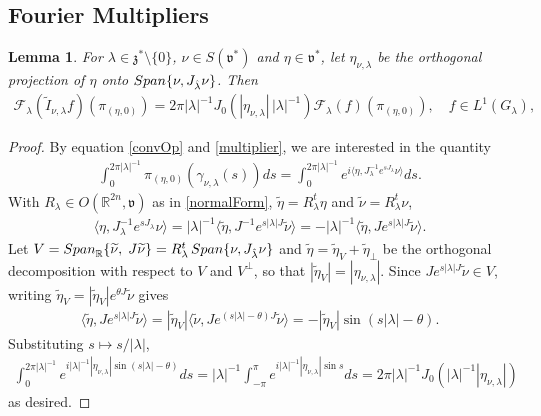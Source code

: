\documentclass[11pt]{amsart}
\theoremstyle{plain}
\newtheorem{lemma}[theorem]{Lemma}
\theoremstyle{definition}
\theoremstyle{remark}
\numberwithin{equation}{section}
\def\fz{\mathfrak{z}}
\def\fv{\mathfrak{v}}
\def\mz{\setminus\{0\}}
\def\R{{\mathbb R}}%
\numberwithin{equation}{section}
\begin{document}
\subsection{Fourier Multipliers}
\begin{lemma}\label{l:scalarMultiplier} For $\lambda\in \fz^*\mz$, $\nu\in S(\fv^*)$ and $\eta\in \fv^*$, let $\eta_{\nu, \lambda}$ be the orthogonal projection of $\eta$ onto ${\rm Span}\{\nu, J_{\hat\lambda}\nu\}$. Then
	\begin{align*}
		\mathcal{F}_\lambda\left(\widetilde{I}_{\nu, \lambda} f\right)(\pi_{(\eta, 0)})=2\pi|\lambda|^{-1}J_0(|\eta_{\nu, \lambda}|\,|\lambda|^{-1})\mathcal{F}_\lambda(f)(\pi_{(\eta, 0)}), \quad f\in L^1(G_\lambda),
	\end{align*}	
\end{lemma}
\begin{proof}
	By equation \eqref{convOp} and \eqref{multiplier}, we are interested in the quantity
	\begin{align*}
		\int_0^{2\pi|\lambda|^{-1}}\pi_{(\eta, 0)}(\gamma_{\nu, \lambda}(s))ds=
	\int_0^{2\pi|\lambda|^{-1}}e^{i\langle \eta, J_\lambda^{-1}e^{sJ_\lambda}\nu\rangle}ds.		
	\end{align*}
With $R_\lambda\in O(\R^{2n}, \fv)$ as in \eqref{normalForm}, $\widetilde{\eta}=R_\lambda^t\eta$ and $\widetilde{\nu}=R_\lambda^t\nu$,
\begin{align*}
	\langle \eta, J_\lambda^{-1}e^{sJ_\lambda}\nu\rangle
	=|\lambda|^{-1}\langle \widetilde{\eta}, J^{-1}e^{s|\lambda|J}\widetilde{\nu}\rangle=-|\lambda|^{-1}\langle \widetilde{\eta}, Je^{s|\lambda|J}\widetilde{\nu}\rangle.
\end{align*}
Let $V={{\rm Span}}_\R\{\widetilde{\nu},\; J\widetilde{\nu}\}=R_\lambda^t\,{\rm Span}\{\nu, J_{\hat\lambda}\nu\}$ and $\widetilde{\eta}=\widetilde{\eta}_V+\widetilde{\eta}_\perp$ be the orthogonal decomposition with respect to $V$ and $V^\perp$, so that $|\widetilde{\eta}_V|=|\eta_{\nu, \lambda}|$. Since $Je^{s|\lambda|J}\widetilde{\nu}\in V$, writing $\widetilde{\eta}_V=|\widetilde{\eta}_V|e^{\theta J}\widetilde{\nu}$ gives
\begin{align*}
	\langle \widetilde{\eta}, Je^{s|\lambda| J}\widetilde{\nu}\rangle=|\widetilde{\eta}_V|\langle \widetilde{\nu}, Je^{(s|\lambda|-\theta)J}\widetilde{\nu}\rangle=-|\widetilde{\eta}_V|\sin{(s|\lambda|-\theta)}.
\end{align*}
Substituting $s\mapsto s/|\lambda|$,
\begin{align*}
	\int_0^{2\pi|\lambda|^{-1}}e^{i|\lambda|^{-1}|\eta_{\nu, \lambda}| \sin{(s|\lambda|-\theta)}}ds=|\lambda|^{-1}\int_{-\pi}^{\pi}e^{i|\lambda|^{-1}|\eta_{\nu, \lambda}| \sin{s}}ds=2\pi|\lambda|^{-1}J_0(|\lambda|^{-1}|\eta_{\nu, \lambda}|)
\end{align*}
as desired. 
\end{proof}
\end{document}
